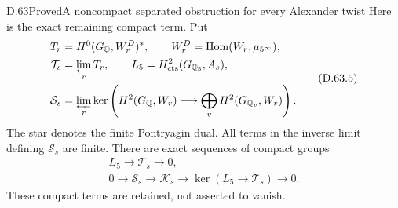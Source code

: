 \begin{statement}{D.63}{Proved}{A noncompact separated obstruction for every Alexander twist}
Here is the exact remaining compact term. Put
\[
 \begin{split}
 T_r&=H^0(G_{\mathbb Q},W_r^D)^*,\qquad
 W_r^D=\operatorname{Hom}(W_r,\mu_{5^\infty}),\\
 \mathcal T_s&=\varprojlim_r T_r,
 \qquad L_5=H^2_{\mathrm{cts}}(G_{\mathbb Q_5},A_s),\\
 \mathcal S_s&=\varprojlim_r
   \ker\left(H^2(G_{\mathbb Q},W_r)
                   \longrightarrow\bigoplus_vH^2(G_{\mathbb Q_v},W_r)\right).
 \end{split}                                             \tag{D.63.5}
\]
The star denotes the finite Pontryagin dual. All terms
in the inverse limit defining \(\mathcal S_s\) are finite.
There are exact sequences of compact groups
\[
 \begin{gathered}
 L_5\longrightarrow\mathcal T_s\longrightarrow0,\\
 0\longrightarrow\mathcal S_s\longrightarrow\mathcal K_s
     \longrightarrow\ker(L_5\longrightarrow\mathcal T_s)
     \longrightarrow0.
 \end{gathered}                                         \tag{D.63.6}
\]
These compact terms are retained, not asserted to vanish.


\end{statement}

